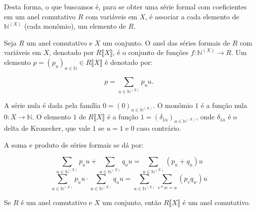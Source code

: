 Desta forma, o que buscamos é, para se obter uma série formal com coeficientes em um anel comutativo $R$ com variáveis em $X$, é associar a cada elemento de $\mathbb N^{(X)}$ (cada monômio), um elemento de $R$.
\begin{definition}
    Seja $R$ um anel comutativo e $X$ um conjunto. O anel das séries formais de $R$ com variáveis em $X$, denotado por $R\llbracket X\rrbracket$, é o conjunto de funções $f:\mathbb N^{(X)}\rightarrow R$. Um elemento $p=(p_u)_{u \in \mathbb N}\in R\llbracket X\rrbracket$ é denotado por:

    \[p=\sum_{u \in \mathbb N^{(X)}}p_u u.\]

    A série nula é dada pela família $0=(0)_{u \in \mathbb N^{(X)}}$.
    O monômio $1$ é a função nula $0:X\rightarrow \mathbb N$. O elemento $1$ de $R\llbracket X\rrbracket$ é a função $1=(\delta_{1u})_{u \in \mathbb N^{(X)}}$, onde $\delta_{1u}$ é o delta de Kronecker, que vale $1$ se $u=1$ e $0$ caso contrário.

    A soma e produto de séries formais se dá por:

    \[\sum_{u \in \mathbb N^{(X)}}p_u u+\sum_{u \in \mathbb N^{(X)}}q_u u=\sum_{u \in \mathbb N^{(X)}}(p_u+q_u)u\]
    \[\sum_{u \in \mathbb N^{(X)}}p_u u\cdot \sum_{u \in \mathbb N^{(X)}}q_u u=\sum_{u \in \mathbb N^{(X)}}\sum_{v*w=u}(p_vq_w)u\]
\end{definition}

\begin{lemma}
    Se $R$ é um anel comutativo e $X$ um conjunto, então $R\llbracket X \rrbracket$ é um anel comutativo.
\end{lemma}

